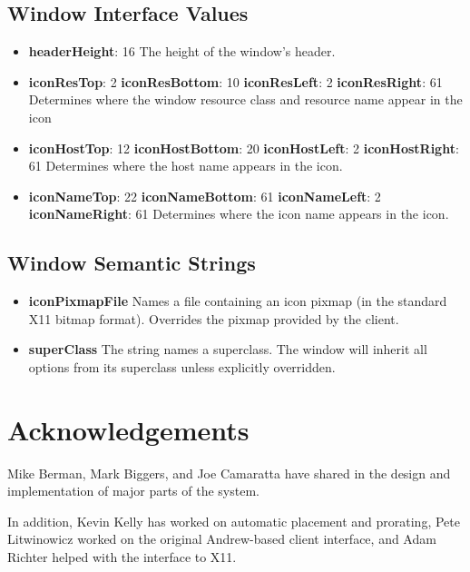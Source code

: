\subsection{Window Interface Values}

\begin{itemize}
\item {\bf headerHeight}: 16\newline{}
The height of the window's header.

\item {\bf iconResTop}: 2\newline{}
{\bf iconResBottom}: 10\newline{}
{\bf iconResLeft}: 2\newline{}
{\bf iconResRight}: 61\newline{}
Determines where the window resource class and resource name appear
in the icon

\item {\bf iconHostTop}: 12\newline{}
{\bf iconHostBottom}: 20\newline{}
{\bf iconHostLeft}: 2\newline{}
{\bf iconHostRight}: 61\newline{}
Determines where the host name appears in the icon.

\item {\bf iconNameTop}: 22\newline{}
{\bf iconNameBottom}: 61\newline{}
{\bf iconNameLeft}: 2\newline{}
{\bf iconNameRight}: 61\newline{}
Determines where the icon name appears in the icon.
\end{itemize}

\subsection{Window Semantic Strings}

\begin{itemize}
\item {\bf iconPixmapFile}\newline{}
Names a file containing an icon pixmap (in the standard X11
bitmap format).  Overrides the pixmap provided by the client.

\item {\bf superClass}\newline{}
The string names a superclass.  The window will inherit all options
from its superclass unless explicitly overridden.
\end{itemize}

\section{Acknowledgements}

Mike Berman, Mark Biggers, and Joe Camaratta have shared
in the design and implementation of major parts of the system.

In addition, Kevin Kelly has worked on automatic
placement and prorating,
Pete Litwinowicz worked on the original Andrew-based client
interface, and Adam Richter helped with the interface to X11.


